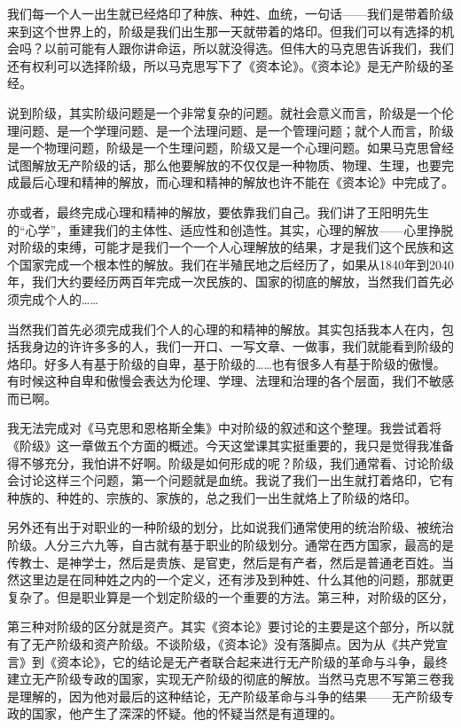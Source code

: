 \documentclass[UTF8, 12pt, a4paper]{ctexrep}
\begin{document}
我们每一个人一出生就已经烙印了种族、种姓、血统，一句话——我们是带着阶级来到这个世界上的，阶级是我们出生那一天就带着的烙印。但我们可以有选择的机会吗？以前可能有人跟你讲命运，所以就没得选。但伟大的马克思告诉我们，我们还有权利可以选择阶级，所以马克思写下了《资本论》。《资本论》是无产阶级的圣经。

说到阶级，其实阶级问题是一个非常复杂的问题。就社会意义而言，阶级是一个伦理问题、是一个学理问题、是一个法理问题、是一个管理问题；就个人而言，阶级是一个物理问题，阶级是一个生理问题，阶级又是一个心理问题。如果马克思曾经试图解放无产阶级的话，那么他要解放的不仅仅是一种物质、物理、生理，也要完成最后心理和精神的解放，而心理和精神的解放也许不能在《资本论》中完成了。

亦或者，最终完成心理和精神的解放，要依靠我们自己。我们讲了王阳明先生的“心学”，重建我们的主体性、适应性和创造性。其实，心理的解放——心里挣脱对阶级的束缚，可能才是我们一个一个人心理解放的结果，才是我们这个民族和这个国家完成一个根本性的解放。我们在半殖民地之后经历了，如果从1840年到2040年，我们大约要经历两百年完成一次民族的、国家的彻底的解放，当然我们首先必须完成个人的……

当然我们首先必须完成我们个人的心理的和精神的解放。其实包括我本人在内，包括我身边的许许多多的人，我们一开口、一写文章、一做事，我们就能看到阶级的烙印。好多人有基于阶级的自卑，基于阶级的……也有很多人有基于阶级的傲慢。有时候这种自卑和傲慢会表达为伦理、学理、法理和治理的各个层面，我们不敏感而已啊。

我无法完成对《马克思和恩格斯全集》中对阶级的叙述和这个整理。我尝试着将《阶级》这一章做五个方面的概述。今天这堂课其实挺重要的，我只是觉得我准备得不够充分，我怕讲不好啊。阶级是如何形成的呢？阶级，我们通常看、讨论阶级会讨论这样三个问题，第一个问题就是血统。我说了我们一出生就打着烙印，它有种族的、种姓的、宗族的、家族的，总之我们一出生就烙上了阶级的烙印。

另外还有出于对职业的一种阶级的划分，比如说我们通常使用的统治阶级、被统治阶级。人分三六九等，自古就有基于职业的阶级划分。通常在西方国家，最高的是传教士、是神学士，然后是贵族、是官吏，然后是有产者，然后是普通老百姓。当然这里边是在同种姓之内的一个定义，还有涉及到种姓、什么其他的问题，那就更复杂了。但是职业算是一个划定阶级的一个重要的方法。第三种，对阶级的区分，

第三种对阶级的区分就是资产。其实《资本论》要讨论的主要是这个部分，所以就有了无产阶级和资产阶级。不谈阶级，《资本论》没有落脚点。因为从《共产党宣言》到《资本论》，它的结论是无产者联合起来进行无产阶级的革命与斗争，最终建立无产阶级专政的国家，实现无产阶级的彻底的解放。当然马克思不写第三卷我是理解的，因为他对最后的这种结论，无产阶级革命与斗争的结果——无产阶级专政的国家，他产生了深深的怀疑。他的怀疑当然是有道理的。
\end{document}
